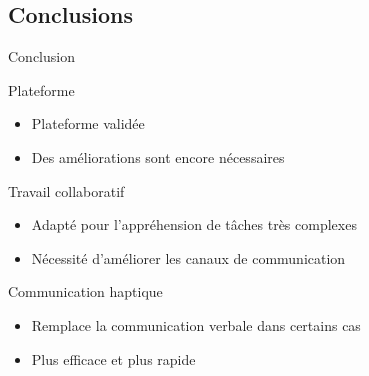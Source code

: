 \documentclass[english,french,dvips,10pt]{mybeamer}
\begin{document}
	\subsection{Conclusions}
	\begin{myframe}{Conclusion}
		\begin{myblock}{Plateforme \myShaddock}
			\begin{itemize}
				\item Plateforme validée
				\item Des améliorations sont encore nécessaires
			\end{itemize}
		\end{myblock}
		\begin{myblock}{Travail collaboratif}
			\begin{itemize}
				\item Adapté pour l'appréhension de tâches très complexes
				\item Nécessité d'améliorer les canaux de communication
			\end{itemize}
		\end{myblock}
		\begin{myblock}{Communication haptique}
			\begin{itemize}
				\item Remplace la communication verbale dans certains cas
				\item Plus efficace et plus rapide
			\end{itemize}
		\end{myblock}
	\end{myframe}
\end{document}
